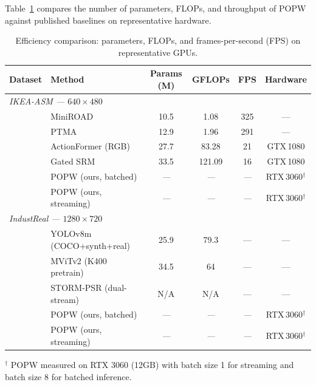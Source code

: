 \documentclass[11pt,a4paper]{article}
\newcommand{\popw}{POPW}
\newcommand{\ikea}{IKEA-ASM}
\newcommand{\industreal}{IndustReal}
\newcommand{\todo}{\textit{---}}
\newcommand{\popwres}{\todo}
\begin{document}
Table~\ref{tab:efficiency} compares the number of parameters, FLOPs, and throughput of POPW against published baselines on representative hardware.

\begin{table}[!htbp]
\centering
\small
\caption{Efficiency comparison: parameters, FLOPs, and frames-per-second (FPS) on representative GPUs.}
\label{tab:efficiency}
\begin{tabular}{l l c c c c}
\toprule
\textbf{Dataset} & \textbf{Method} & \textbf{Params (M)} & \textbf{GFLOPs} & \textbf{FPS} & \textbf{Hardware} \\
\midrule
\multicolumn{6}{l}{\textit{\ikea{} --- $640\times480$}} \\
 & MiniROAD~\cite{xie2025ptma}              & 10.5 &   1.08 & 325 & --- \\
 & PTMA~\cite{xie2025ptma}                  & 12.9 &   1.96 & 291 & --- \\
 & ActionFormer (RGB)~\cite{zhang2022actionformer}   & 27.7 &  83.28 &  21 & GTX\,1080 \\
 & Gated SRM~\cite{gatedsrm2026}            & 33.5 & 121.09 &  16 & GTX\,1080 \\
 & \popw{} (ours, batched)                  & {\popwres} & {\popwres} & {\popwres} & RTX\,3060$^\dagger$ \\
 & \popw{} (ours, streaming)                & {\popwres} & {\popwres} & {\popwres} & RTX\,3060$^\dagger$ \\
\midrule
\multicolumn{6}{l}{\textit{\industreal{} --- $1280\times720$}} \\
 & YOLOv8m (COCO+synth+real)~\cite{schoonbeek2024industreal}     & 25.9 & 79.3 & --- & --- \\
 & MViTv2 (K400 pretrain)~\cite{schoonbeek2024industreal} & 34.5 & 64 & --- & --- \\
 & STORM-PSR (dual-stream)~\cite{schoonbeek2025storm}   & N/A & N/A & --- & --- \\
 & \popw{} (ours, batched)                     & {\popwres} & {\popwres} & {\popwres} & RTX\,3060$^\dagger$ \\
 & \popw{} (ours, streaming)                   & {\popwres} & {\popwres} & {\popwres} & RTX\,3060$^\dagger$ \\
\bottomrule
\end{tabular}

\vspace{0.3em}
\footnotesize
$^\dagger$ \popw{} measured on RTX 3060 (12GB) with batch size 1 for streaming and batch size 8 for batched inference.
\end{table}
\end{document}
